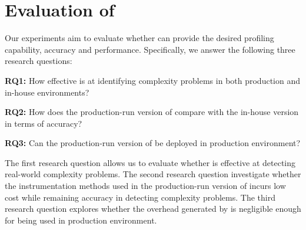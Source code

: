 \section{Evaluation of \Tool}
\label{sec:eva}



Our experiments aim to evaluate whether \Tool 
can provide the desired profiling capability, accuracy and performance. 
Specifically, we answer the following three research questions:


\vspace*{3pt}
\noindent
 {\bf RQ1:} 
How effective is \Tool at identifying complexity problems
in both production and in-house environments?

\vspace*{3pt}
\noindent
{\bf RQ2:}
How does the production-run version of \Tool 
compare with the in-house version in terms of
accuracy?

\vspace*{3pt}
\noindent
{\bf RQ3:}
Can the production-run version of \Tool be deployed
in production environment?







\vspace*{2pt}


The first research question allows us to evaluate whether \Tool is effective 
at detecting real-world complexity problems. 
The second research question investigate whether the instrumentation methods 
used in the production-run version of \Tool incurs low cost while remaining
accuracy in detecting complexity problems. 
The third research question explores whether the overhead generated 
by \Tool is negligible enough for being used in production environment.



